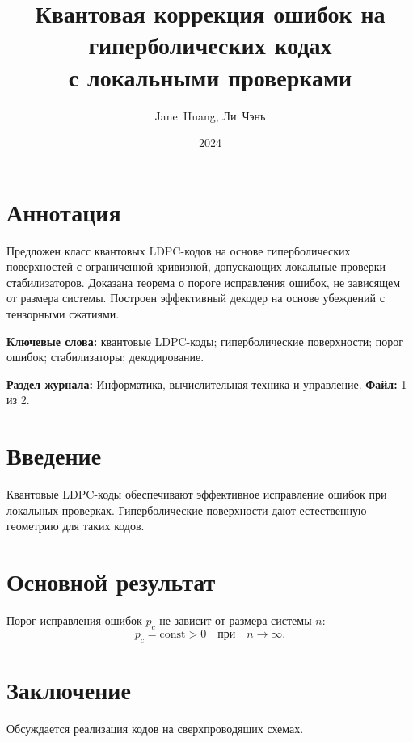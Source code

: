 \documentclass[12pt]{article}
\title{Квантовая коррекция ошибок на гиперболических кодах\\ с локальными проверками}
\author{Jane~Huang, Ли~Чэнь}
\date{2024}
\begin{document}
\maketitle

\section*{Аннотация}
Предложен класс квантовых LDPC-кодов на основе гиперболических поверхностей с ограниченной кривизной, допускающих локальные проверки стабилизаторов. Доказана теорема о пороге исправления ошибок, не зависящем от размера системы. Построен эффективный декодер на основе убеждений с тензорными сжатиями.

\vspace{0.5cm}
\noindent\textbf{Ключевые слова:} квантовые LDPC-коды; гиперболические поверхности; порог ошибок; стабилизаторы; декодирование.

\vspace{0.3cm}
\noindent\textbf{Раздел журнала:} Информатика, вычислительная техника и управление. \quad \textbf{Файл:} 1 из 2.

\section{Введение}
Квантовые LDPC-коды обеспечивают эффективное исправление ошибок при локальных проверках. Гиперболические поверхности дают естественную геометрию для таких кодов.

\section{Основной результат}
Порог исправления ошибок $p_c$ не зависит от размера системы $n$:
\begin{equation}
p_c = \text{const} > 0 \quad \text{при} \quad n \to \infty.
\end{equation}

\section{Заключение}
Обсуждается реализация кодов на сверхпроводящих схемах.
\end{document}

